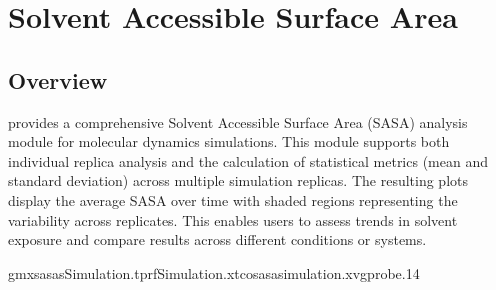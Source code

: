 \documentclass[a4paper,10pt,english]{sphinxmanual}
\begin{document}
\begin{sphinxVerbatim}[commandchars=\\\{\}]
  
     

  
  
\end{sphinxVerbatim}

\sphinxstepscope


\chapter{Solvent Accessible Surface Area}
\label{\detokenize{SASA:solvent-accessible-surface-area}}\label{\detokenize{SASA::doc}}

\section{Overview}
\label{\detokenize{SASA:overview}}
\sphinxAtStartPar
{} provides a comprehensive Solvent Accessible Surface Area (SASA) analysis module for molecular dynamics simulations. This module supports both individual replica analysis and the calculation of statistical metrics (mean and standard deviation) across multiple simulation replicas. The resulting plots display the average SASA over time with shaded regions representing the variability across replicates. This enables users to assess trends in solvent exposure and compare results across different conditions or systems.

\sphinxAtStartPar
{}

\begin{sphinxVerbatim}[commandchars=\\\{\}]
gmxsasa\PYGZhy{}sSimulation.tpr\PYGZhy{}fSimulation.xtc\PYGZhy{}osasa\PYGZus{}simulation.xvg\PYGZhy{}probe.14
\end{sphinxVerbatim}

\begin{sphinxVerbatim}[commandchars=\\\{\}]
   
\end{sphinxVerbatim}
\end{document}
